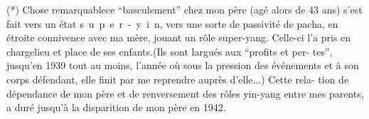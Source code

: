 (*) Chose remarquable\inserted{,}ce ``basculement'' chez mon père (agé alors de 43 ans) s'est
fait vers un état \mbox{s u p e r - y i n}, vers une sorte de passivité de pacha, en
étroite connivence avec ma mère, jouant un rôle super-yang. Celle-ci l'a pris en
charge\quad lieu et place de ses enfants.(Ils sont largués aux ``profits et per-\linebreak
tes'', jusqu'en 1939 tout au moins, l'année où sous la pression des événements et
à son corps défendant, elle finit par me reprendre auprès d'elle...) Cette rela-\linebreak
tion de dépendance de mon père et de renversement des rôles yin-yang entre mes
parents, a duré jusqu'à la disparition de mon père en 1942.
\margin{\unsure{-}}

